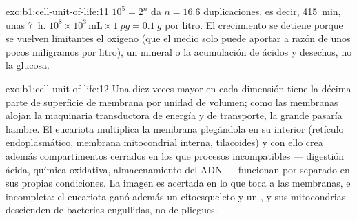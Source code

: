 \begin{solution}{exo:b1:cell-unit-of-life:11}
$10^5 = 2^{n}$ da $n = 16.6$ duplicaciones, es decir, \qty{415}{min}, unas
\qty{7}{h}. $10^8\times 10^3\,\mathrm{mL}\times\qty{1}{pg} = \qty{0.1}{g}$
por litro. El crecimiento se detiene porque se vuelven limitantes el oxígeno
(que el medio solo puede aportar a razón de unos pocos miligramos por
litro), un mineral o la acumulación de ácidos y desechos, no la glucosa.
\end{solution}

\begin{solution}{exo:b1:cell-unit-of-life:12}
Una  diez veces mayor en cada dimensión tiene la décima parte de
superficie de membrana por unidad de volumen; como las membranas alojan la
maquinaria transductora de energía y de transporte, la  grande pasaría
hambre. El eucariota multiplica la membrana plegándola en su interior
(retículo endoplasmático, membrana mitocondrial interna, tilacoides) y con
ello crea además compartimentos cerrados en los que procesos incompatibles
--- digestión ácida, química oxidativa, almacenamiento del ADN --- funcionan
por separado en sus propias condiciones. La imagen es acertada en lo que
toca a las membranas, e incompleta: el eucariota ganó además un
citoesqueleto y un , y sus mitocondrias descienden de bacterias
engullidas, no de pliegues.
\end{solution}

